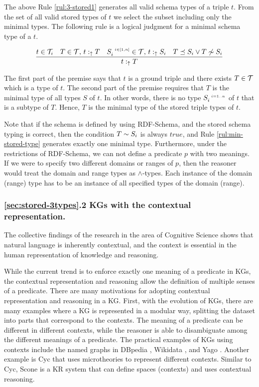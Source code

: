 \documentclass[runningheads]{llncs}
\newcommand{\s}{\scriptscriptstyle\ \,}
\newcommand{\uarr}{\uparrow}
\newcommand{\T}{{\cal T}}
\begin{document}
The above Rule \ref{rul:3-stored1} generates all valid schema types of
a triple $t$. From the set of all valid stored types of $t$ we select
the subset including only the minimal types. The following rule is a
logical judgment for a minimal schema type of a $t$. 

\begin{equation}
\label{rul:min-stored-type}
\dfrac{t\in\T_i\quad T\in\T,\, t:_\uarr\/T\quad\/S_i^{\s\/i\in[1,n]}\in\T,\, t:_\uarr\/S_i\quad T\preceq\/S_i\lor\/T\not\sim\/S_i}
      {t:_{\uarr}\/T}
\end{equation}

The first part of the premise says that $t$ is a ground triple and there
exists $T\in\T$ which is a type of $t$. The second part of the premise
requires that $T$ is the minimal type of all types $S$ of $t$. In
other words, there is no type $S_i^{\s\/i=1..n}$ of $t$ that is a
subtype of $T$. Hence, $T$ is the minimal type of the stored triple
types of $t$.

Note that if the schema is defined by using RDF-Schema, and the stored
schema typing is correct, then the condition $T\sim\/S_i$ is always
$true$, and Rule \ref{rul:min-stored-type} generates exactly one
minimal type. Furthermore, under the restrictions of RDF-Schema, we can
not define a predicate $p$ with two meanings. If we were to specify two
different domains or ranges of $p$, then the reasoner would treat the
domain and range types as $\land$-types. Each instance of the domain
(range) type has to be an instance of all specified types of the
domain (range).

% 



\subsubsection{\ref{sec:stored-3types}.2 KGs with the contextual representation.}

The collective findings of the research in the area of Cognitive
Science \cite{Hollister2017} shows that natural language is inherently
contextual, and the context is essential in the human representation
of knowledge and reasoning. 

While the current trend is to enforce exactly one meaning of a
predicate in KGs, the contextual representation and reasoning allow
the definition of multiple senses of a predicate. There are many
motivations for adopting contextual representation and reasoning in a
KG. First, with the evolution of KGs, there are many examples where a
KG is represented in a modular way, splitting the dataset into parts
that correspond to the contexts. The meaning of a predicate can be
different in different contexts, while the reasoner is able to
disambiguate among the different meanings of a predicate.
The practical examples of KGs using contexts include the named graphs
in DBpedia \cite{Auer2007}, Wikidata \cite{vrandecic2014}, and Yago
\cite{Hoffart2013}. Another example is Cyc \cite{cyc} that uses
microtheories to represent different contexts. Similar to Cyc, Scone
\cite{Fahlman2011} is a KR system that can define spaces (contexts)
and uses contextual reasoning.
\end{document}
